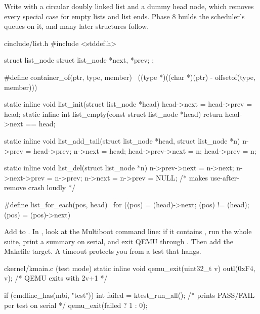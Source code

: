 \documentclass[11pt,a4paper]{article}
\begin{document}
Write  with a circular doubly linked list and a dummy head node, which removes every special
case for empty lists and list ends. Phase 8 builds the scheduler's queues on it, and many later structures follow.

\begin{lst}{c}{include/list.h}
#include <stddef.h>

struct list_node { struct list_node *next, *prev; };

#define container_of(ptr, type, member) \
    ((type *)((char *)(ptr) - offsetof(type, member)))

static inline void list_init(struct list_node *head) { head->next = head->prev = head; }
static inline int  list_empty(const struct list_node *head) { return head->next == head; }

static inline void list_add_tail(struct list_node *head, struct list_node *n)
{
    n->prev = head->prev;
    n->next = head;
    head->prev->next = n;
    head->prev = n;
}

static inline void list_del(struct list_node *n)
{
    n->prev->next = n->next;
    n->next->prev = n->prev;
    n->next = n->prev = NULL;      /* makes use-after-remove crash loudly */
}

#define list_for_each(pos, head) \
    for ((pos) = (head)->next; (pos) != (head); (pos) = (pos)->next)
\end{lst}

Add  to . In , look at the Multiboot command line: if it contains , run
the whole suite, print a summary on serial, and exit QEMU through . Then add the Makefile target.
A timeout protects you from a test that hangs.

\begin{lst}{c}{kernel/kmain.c (test mode)}
static inline void qemu_exit(uint32_t v) { outl(0xF4, v); }   /* QEMU exits with 2v+1 */

if (cmdline_has(mbi, "test")) {
    int failed = ktest_run_all();          /* prints PASS/FAIL per test on serial */
    qemu_exit(failed ? 1 : 0);
}
\end{lst}

\end{document}
